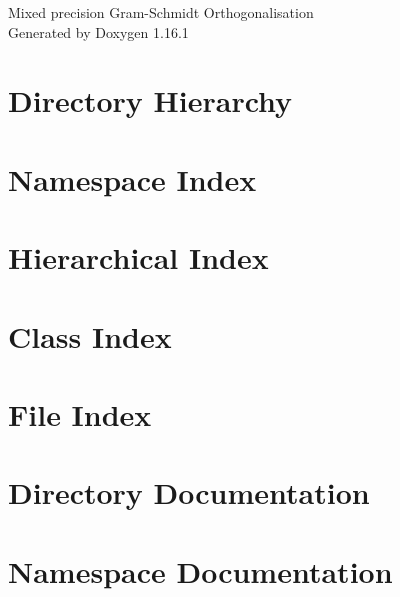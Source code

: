 \documentclass[twoside]{book}
\newcommand{\+}{\discretionary{\mbox{\scriptsize$\hookleftarrow$}}{}{}}
\newcommand{\clearemptydoublepage}{%
    \newpage{\pagestyle{empty}\cleardoublepage}%
  }
\begin{document}
  \raggedbottom
    \hypersetup{pageanchor=false,
                bookmarksnumbered=true,
                pdfencoding=unicode
               }
  \begin{titlepage}
  \vspace*{7cm}
  \begin{center}%
  {\Large Mixed precision Gram-\/\+Schmidt Orthogonalisation}\\
  \vspace*{1cm}
  {\large Generated by Doxygen 1.16.1}\\
  \end{center}
  \end{titlepage}
  \clearemptydoublepage
  \tableofcontents
  \clearemptydoublepage
  \hypersetup{pageanchor=true}
\chapter{Directory Hierarchy}

\chapter{Namespace Index}

\chapter{Hierarchical Index}

\chapter{Class Index}

\chapter{File Index}

\chapter{Directory Documentation}




\chapter{Namespace Documentation}

\end{document}
